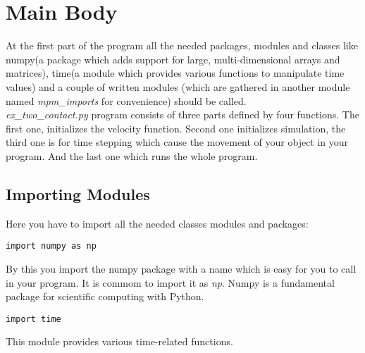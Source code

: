 \documentclass[11pt,fleqn]{book} %
\begin{document}
  \pagestyle{empty} %
  \tableofcontents %
  \cleardoublepage %
  \pagestyle{fancy} %

\setlength{\parindent}{5pt}
\setlength{\parskip}{5pt}

\chapter{Main Body} 
\label{sec:Main Body} 
At the first part of the program all the needed packages, modules and classes like numpy(a package which adds support for large, multi-dimensional arrays and matrices), time(a module which provides various functions to manipulate time values) and a couple of written modules (which are gathered in another module named  \emph{mpm\_imports} for convenience) should be called. \\ \emph{ex\_two\_contact.py} program consists of three parts defined by four functions. The first one, initializes the velocity function. Second one initializes simulation, the third one is for time stepping which cause the movement of your object in your program. And the last one which runs the whole program.

\section{Importing Modules}
Here you have to import all the needed classes modules and packages:

\begin{lstlisting}
import numpy as np
\end{lstlisting}

By this you import the numpy package with a name which is easy for you to call in your program. It is commom to import it as \emph{np}. Numpy is a fundamental package for scientific computing with Python.

\begin{lstlisting}
import time
\end{lstlisting}

This module provides various time-related functions.
\end{document}
